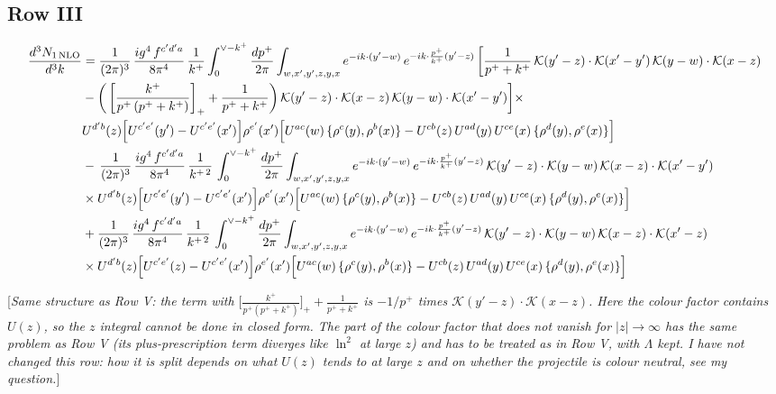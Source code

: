\documentclass[9pt]{article}
\numberwithin{equation}{section}
\newcommand{\rnote}[1]{{\color{teal}[\textit{#1}]}}
\begin{document}
\subsection{Row III}
\begin{align}
\frac{d^{3}N_{1\,\rm NLO}}{d^{3}k} & = \frac{1}{(2\pi)^{3}}\,\frac{ig^{4}\,f^{c'd'a}}{8\pi^{4}}\,\frac{1}{k^{+}}\int_{0}^{\vee-k^{+}}\frac{dp^{+}}{2\pi}\int_{w,x',y',z,y,x}e^{-ik\cdot(y'-w)}\,e^{-ik\cdot\frac{p^{+}}{k^{+}}(y'-z)}\,\bigg[\frac{1}{p^{+}+k^{+}}\,\mathcal{K}(y'-z)\cdot\mathcal{K}(x'-y')\,\mathcal{K}(y-w)\cdot\mathcal{K}(x-z)\notag \\ & -\bigg(\left[\frac{k^{+}}{p^{+}\,(p^{+}+k^{+})}\right]_{+}+\frac{1}{p^{+}+k^{+}}\bigg)\,\mathcal{K}(y'-z)\cdot\mathcal{K}(x-z)\,\mathcal{K}(y-w)\cdot\mathcal{K}(x'-y')\bigg]\times\notag\\
&U^{d'b}(z)\Big[U^{c'e'}(y')-U^{c'e'}(x')\Big]\rho^{e'}(x')\Big[U^{ac}(w)\,\{\rho^{c}(y),\rho^{b}(x)\}-U^{cb}(z)\,U^{ad}(y)\,U^{ce}(x)\,\{\rho^{d}(y),\rho^{e}(x)\}\Big]\notag\\
&-\,\frac{1}{(2\pi)^{3}}\,\frac{ig^{4}\,f^{c'd'a}}{8\pi^{4}}\,\frac{1}{k^{+\,2}}\,\int_{0}^{\vee-k^{+}}\frac{dp^{+}}{2\pi}\int_{w,x',y',z,y,x}e^{-ik\cdot(y'-w)}\,e^{-ik\cdot\frac{p^{+}}{k^{+}}(y'-z)}\,\mathcal{K}(y'-z)\cdot\mathcal{K}(y-w)\,\mathcal{K}(x-z)\cdot\mathcal{K}(x'-y')\notag \\ & \times U^{d'b}(z)\Big[U^{c'e'}(y')-U^{c'e'}(x')\Big]\rho^{e'}(x')\Big[U^{ac}(w)\,\{\rho^{c}(y),\rho^{b}(x)\}-U^{cb}(z)\,U^{ad}(y)\,U^{ce}(x)\,\{\rho^{d}(y),\rho^{e}(x)\}\Big]\notag\\
&+\frac{1}{(2\pi)^{3}}\,\frac{ig^{4}\,f^{c'd'a}}{8\pi^{4}}\,\frac{1}{k^{+\,2}}\,\int_{0}^{\vee-k^{+}}\frac{dp^{+}}{2\pi}\int_{w,x',y',z,y,x}e^{-ik\cdot(y'-w)}\,e^{-ik\cdot\frac{p^{+}}{k^{+}}(y'-z)}\,\mathcal{K}(y'-z)\cdot\mathcal{K}(y-w)\,\mathcal{K}(x-z)\cdot\mathcal{K}(x'-z)\notag \\ & \times U^{d'b}(z)\Big[U^{c'e'}(z)-U^{c'e'}(x')\Big]\rho^{e'}(x')\Big[U^{ac}(w)\,\{\rho^{c}(y),\rho^{b}(x)\}-U^{cb}(z)\,U^{ad}(y)\,U^{ce}(x)\,\{\rho^{d}(y),\rho^{e}(x)\}\Big]
\end{align}

\rnote{Same structure as Row V: the term with $\big[\frac{k^{+}}{p^{+}(p^{+}+k^{+})}\big]_{+}+\frac{1}{p^{+}+k^{+}}$ is $-1/p^{+}$ times $\mathcal{K}(y'-z)\cdot\mathcal{K}(x-z)$. Here the colour factor contains $U(z)$, so the $z$ integral cannot be done in closed form. The part of the colour factor that does not vanish for $|z|\to\infty$ has the same problem as Row V (its plus-prescription term diverges like $\ln^{2}$ at large $z$) and has to be treated as in Row V, with $\Lambda$ kept. I have not changed this row: how it is split depends on what $U(z)$ tends to at large $z$ and on whether the projectile is colour neutral, see my question.}
\end{document}
